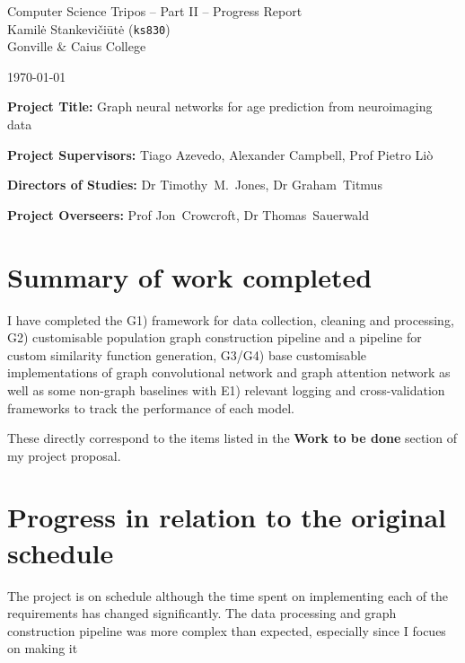 \documentclass[10pt]{article}
\begin{document}
\begin{center}
\Large
Computer Science Tripos -- Part II -- Progress Report\\[4mm]
\large
Kamilė Stankevičiūtė (\texttt{ks830}) \\ Gonville \& Caius College

\today %
\end{center}

\vspace{5mm}

\textbf{Project Title:} Graph neural networks for age prediction from neuroimaging data

\textbf{Project Supervisors:} Tiago Azevedo, Alexander Campbell, Prof Pietro Liò

\textbf{Directors of Studies:} Dr Timothy~M.~Jones, Dr Graham~Titmus

\textbf{Project Overseers:} Prof Jon~Crowcroft, Dr Thomas~Sauerwald

\section*{Summary of work completed}

I have completed the G1) framework for data collection, cleaning and processing, G2) customisable population graph construction pipeline and a pipeline for custom similarity function generation, G3/G4) base customisable implementations of graph convolutional network and graph attention network as well as some non-graph baselines with E1) relevant logging and cross-validation frameworks to track the performance of each model. 

These directly correspond to the items listed in the \textbf{Work to be done} section of my project proposal.

\section*{Progress in relation to the original schedule}
The project is on schedule although the time spent on implementing each of the requirements has changed significantly. The data processing and graph construction pipeline was more complex than expected, especially since I focues on making it 

\end{document}
